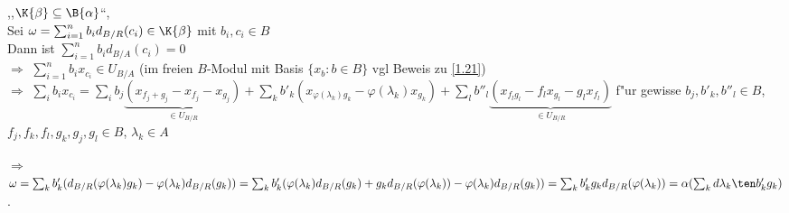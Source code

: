 \begin{Prop}
\begin{enumerate}
\begin{Bew}
,,$\K{\beta} \subseteq \B{\alpha}$``,\\
Sei $\omega = \sum_{i=1}^n{b_i} d_{B/R}(c_i) \in \K{\beta}$ mit $b_i,c_i \in B$\\
Dann ist $\sum_{i=1}^n{b_i d_{B/A}}(c_i) = 0$\\
$\Rightarrow$ $\sum_{i=1}^n{b_i x_{c_i}} \in U_{B/A}$ (im freien $B$-Modul mit Basis $\{ x_b : b \in B \}$ vgl Beweis zu \ref{1.21})\\
$\Rightarrow$ $\sum_i b_i x_{c_i} = \sum_i b_j \underbrace{(x_{f_j + g_j} - x_{f_j} - x_{g_j})}_{\in U_{B/R}} + \sum_k b'_k (x_{\varphi(\lambda_k) g_k} - \varphi(\lambda_k) x_{g_k}) + \sum_l b''_l \underbrace{(x_{f_l g_l} - f_l x_{g_l} - g_l x_{f_l})}_{\in U_{B/R}}$ f"ur gewisse $b_j, b'_k, b''_l \in B$, $f_j,f_k,f_l,g_k,g_j,g_l \in B$, $\lambda_k \in A$

$\Rightarrow$ $\omega = \sum_k b'_k (d_{B/R}(\varphi(\lambda_k) g_k) - \varphi(\lambda_k) d_{B/R}(g_k)) = \sum_k b'_k (\varphi(\lambda_k) d_{B/R}(g_k) + g_k d_{B/R}(\varphi(\lambda_k)) - \varphi(\lambda_k) d_{B/R}(g_k)) = \sum_k b'_k g_k d_{B/R}(\varphi(\lambda_k)) = \alpha(\sum_k d\lambda_k \ten b'_k g_k)$.
\end{Bew}
\end{enumerate}
\end{Prop}
